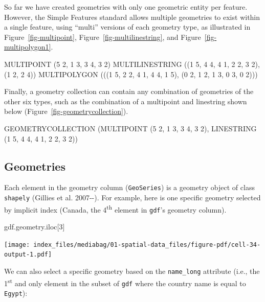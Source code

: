 \documentclass[
  letterpaper,
]{krantz}
\newenvironment{Shaded}{\begin{snugshade}}{\end{snugshade}}
\newcommand{\DecValTok}[1]{\textcolor[rgb]{0.68,0.00,0.00}{#1}}
\newcommand{\NormalTok}[1]{\textcolor[rgb]{0.00,0.23,0.31}{#1}}
\begin{document}
So far we have created geometries with only one geometric entity per
feature. However, the Simple Features standard allows multiple
geometries to exist within a single feature, using ``multi'' versions of
each geometry type, as illustrated in Figure~\ref{fig-multipoint},
Figure~\ref{fig-multilinestring}, and Figure~\ref{fig-multipolygon1}.

\begin{Shaded}
\begin{Highlighting}[]
\NormalTok{MULTIPOINT (5 2, 1 3, 3 4, 3 2)}
\NormalTok{MULTILINESTRING ((1 5, 4 4, 4 1, 2 2, 3 2), (1 2, 2 4))}
\NormalTok{MULTIPOLYGON (((1 5, 2 2, 4 1, 4 4, 1 5), (0 2, 1 2, 1 3, 0 3, 0 2)))}
\end{Highlighting}
\end{Shaded}

Finally, a geometry collection can contain any combination of geometries
of the other six types, such as the combination of a multipoint and
linestring shown below (Figure~\ref{fig-geometrycollection}).

\begin{Shaded}
\begin{Highlighting}[]
\NormalTok{GEOMETRYCOLLECTION (MULTIPOINT (5 2, 1 3, 3 4, 3 2),}
\NormalTok{                    LINESTRING (1 5, 4 4, 4 1, 2 2, 3 2))}
\end{Highlighting}
\end{Shaded}

\subsection{Geometries}\label{sec-geometries}

Each element in the geometry column (\texttt{GeoSeries}) is a geometry
object of class \texttt{shapely} (Gillies et al. 2007-\/-). For example,
here is one specific geometry selected by implicit index (Canada, the
4\textsuperscript{th} element in \texttt{gdf}'s geometry column).

\begin{Shaded}
\begin{Highlighting}[]
\NormalTok{gdf.geometry.iloc[}\DecValTok{3}\NormalTok{]}
\end{Highlighting}
\end{Shaded}

\texttt{[image: index\_files/mediabag/01-spatial-data\_files/figure-pdf/cell-34-output-1.pdf]}

We can also select a specific geometry based on the
\texttt{\textquotesingle{}name\_long\textquotesingle{}} attribute (i.e.,
the 1\textsuperscript{st} and only element in the subset of \texttt{gdf}
where the country name is equal to \texttt{Egypt}):
\end{document}
